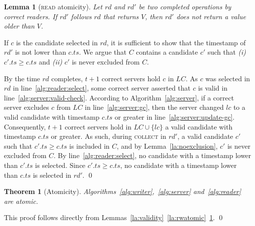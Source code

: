 \documentclass[10pt,conference,compsocconf]{IEEEtran}
\newtheorem{la}[defn]{Lemma}
\newtheorem{theo}[defn]{Theorem}
\newenvironment{prooff}{\vspace{1ex}\noindent{\bf Proof:}\hspace{0.5em}}
	{\hfill\qed\vspace{1em}}
\begin{document}
\begin{la}[\textsc{read} atomicity]\label{la:ratomic}
Let $rd$ and $rd'$ be two completed  operations by correct readers. If $rd'$ follows $rd$ that returns $V$, then $rd'$ does not return a value older than $V$.
\end{la}
\begin{prooff} If $c$ is the candidate selected in $rd$, it is sufficient to show that the timestamp of $rd'$ is not lower than $c.ts$. We argue that
$C$ contains a candidate $c'$ such that \textit{(i)} $c'.ts \geq c.ts$ and \textit{(ii)} $c'$ is never excluded from $C$.

By the time $rd$ completes, $t+1$ correct servers hold $c$ in $LC$. As $c$ was selected in $rd$ in line~\ref{alg:reader:select}, some correct server asserted that $c$ is valid in line~\ref{alg:server:valid-check}. According to Algorithm~\ref{alg:server}, if a correct server excludes $c$ from $LC$ in line~\ref{alg:server:gc}, then the server changed $lc$ to a valid candidate with timestamp $c.ts$ or greater in line~\ref{alg:server:update-gc}. Consequently, $t+1$ correct servers hold in $LC \cup \{ lc \}$ a valid candidate with timestamp $c.ts$ or greater. As such, during \textsc{collect} in $rd'$, a valid candidate $c'$ such that $c'.ts \geq c.ts$ is included in $C$, and by Lemma~\ref{la:noexclusion}, $c'$ is never excluded from $C$. By line~\ref{alg:reader:select}, no candidate with a timestamp lower than $c'.ts$ is selected. Since $c'.ts \geq c.ts$, no candidate with a timestamp lower than $c.ts$ is selected in $rd'$.
\end{prooff}

\begin{theo}[Atomicity]
Algorithms~\ref{alg:writer},~\ref{alg:server} and~\ref{alg:reader} are atomic.
\end{theo}
\begin{prooff} This proof follows directly from Lemmas~\ref{la:validity}~\ref{la:rwatomic}~\ref{la:ratomic}.
\end{prooff}
\end{document}
